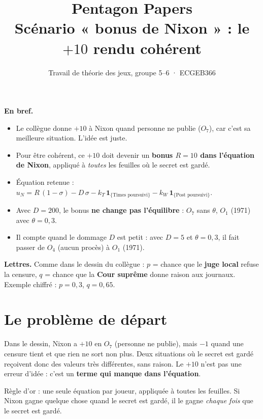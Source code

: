 \documentclass[11pt,a4paper]{article}
\title{\textbf{Pentagon Papers}\\[3pt]\large Scénario « bonus de Nixon » : le $+10$ rendu cohérent}
\author{Travail de théorie des jeux, groupe 5--6 · ECGEB366}
\date{}
\theoremstyle{definition}
\newcommand{\ind}[1]{\mathbf{1}_{\{\text{#1}\}}}
\begin{document}
\maketitle
\vspace{-1.2cm}

\begin{resultat}
\textbf{En bref.}
\begin{itemize}[leftmargin=*,itemsep=1pt,topsep=2pt]
\item Le collègue donne $+10$ à Nixon quand personne ne publie ($O_7$), car c'est sa meilleure situation. L'idée est juste.
\item Pour être cohérent, ce $+10$ doit devenir un \textbf{bonus $R=10$ dans l'équation de Nixon}, appliqué à \emph{toutes} les feuilles où le secret est gardé.
\item Équation retenue : $u_N=R\,(1-\sigma)-D\,\sigma-k_T\,\ind{Times poursuivi}-k_W\,\ind{Post poursuivi}$.
\item Avec $D=200$, le bonus \textbf{ne change pas l'équilibre} : $O_7$ sans $\theta$, $O_1$ (1971) avec $\theta=0,3$.
\item Il compte quand le dommage $D$ est petit : avec $D=5$ et $\theta=0,3$, il fait passer de $O_4$ (aucun procès) à $O_1$ (1971).
\end{itemize}
\end{resultat}

\begin{discuter}
\textbf{Lettres.} Comme dans le dessin du collègue : $p$ = chance que le \textbf{juge local} refuse la censure, $q$ = chance que la \textbf{Cour suprême} donne raison aux journaux. Exemple chiffré : $p=0,3$, $q=0,65$.
\end{discuter}

\section{Le problème de départ}
Dans le dessin, Nixon a $+10$ en $O_7$ (personne ne publie), mais $-1$ quand une censure tient et que rien ne sort non plus. Deux situations où le secret est gardé reçoivent donc des valeurs très différentes, sans raison. Le $+10$ n'est pas une erreur d'idée : c'est un \textbf{terme qui manque dans l'équation}.

\begin{simple}
Règle d'or : une seule équation par joueur, appliquée à toutes les feuilles. Si Nixon gagne quelque chose quand le secret est gardé, il le gagne \emph{chaque fois} que le secret est gardé.
\end{simple}
\end{document}
